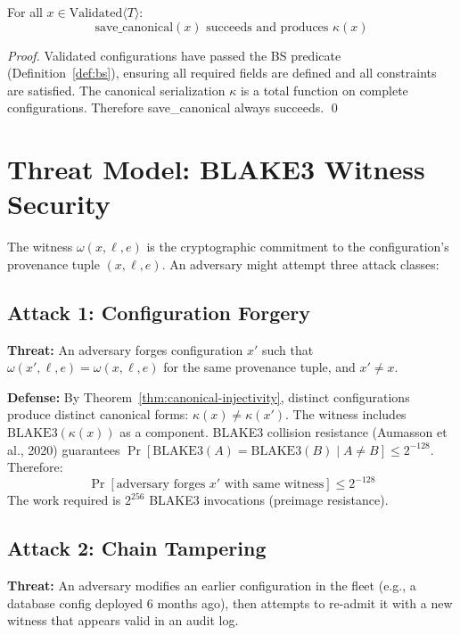 \begin{corollary}
For all $x \in \mathrm{Validated}\langle T\rangle$:
\[
  \mathrm{save\_canonical}(x) \text{ succeeds and produces } \kappa(x)
\]
\end{corollary}

\begin{proof}
Validated configurations have passed the BS predicate (Definition~\ref{def:bs}),
ensuring all required fields are defined and all constraints are satisfied.
The canonical serialization $\kappa$ is a total function on complete configurations.
Therefore save_canonical always succeeds. \qed
\end{proof}

\section{Threat Model: BLAKE3 Witness Security}

The witness $\omega(x, \ell, e)$ is the cryptographic commitment to the
configuration's provenance tuple $(x, \ell, e)$. An adversary might attempt
three attack classes:

\subsection{Attack 1: Configuration Forgery}

\textbf{Threat:} An adversary forges configuration $x'$ such that
$\omega(x', \ell, e) = \omega(x, \ell, e)$ for the same provenance tuple,
and $x' \neq x$.

\textbf{Defense:}
By Theorem~\ref{thm:canonical-injectivity}, distinct configurations produce
distinct canonical forms: $\kappa(x) \neq \kappa(x')$.
The witness includes $\mathrm{BLAKE3}(\kappa(x))$ as a component.
BLAKE3 collision resistance (Aumasson et al., 2020) guarantees
$\Pr[\mathrm{BLAKE3}(A) = \mathrm{BLAKE3}(B) \mid A \neq B] \leq 2^{-128}$.
Therefore:
\[
  \Pr[\text{adversary forges } x' \text{ with same witness}] \leq 2^{-128}
\]
The work required is $2^{256}$ BLAKE3 invocations (preimage resistance).

\subsection{Attack 2: Chain Tampering}

\textbf{Threat:} An adversary modifies an earlier configuration in the fleet
(e.g., a database config deployed 6 months ago), then attempts to re-admit
it with a new witness that appears valid in an audit log.

